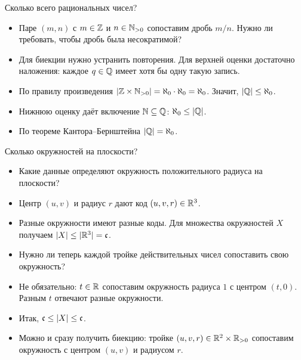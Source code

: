 \documentclass[10pt]{beamer}
\begin{document}
\begin{frame}{Сколько всего рациональных чисел?}
    \begin{itemize}
        \item Паре $(m,n)$ с $m\in\mathbb{Z}$ и $n\in\mathbb{N}_{>0}$ сопоставим дробь $m/n$. Нужно ли требовать, чтобы дробь была несократимой?
        \item<2-> Для биекции нужно устранить повторения. Для верхней оценки достаточно наложения: каждое $q\in\mathbb{Q}$ имеет хотя бы одну такую запись.
        \item<3-> По правилу произведения $|\mathbb{Z}\times\mathbb{N}_{>0}|=\aleph_0\cdot\aleph_0=\aleph_0$. Значит, $|\mathbb{Q}|\leq\aleph_0$.
        \item<4-> Нижнюю оценку даёт включение $\mathbb{N}\subseteq\mathbb{Q}$: $\aleph_0\leq|\mathbb{Q}|$.
        \item<5-> По теореме Кантора--Бернштейна $|\mathbb{Q}|=\aleph_0$.
    \end{itemize}
\end{frame}

\begin{frame}{Сколько окружностей на плоскости?}
    \begin{itemize}
        \item Какие данные определяют окружность положительного радиуса на плоскости?
        \item<2-> Центр $(u,v)$ и радиус $r$ дают код $(u,v,r)\in\mathbb{R}^3$.
        \item<3-> Разные окружности имеют разные коды. Для множества окружностей $X$ получаем $|X|\leq|\mathbb{R}^3|=\mathfrak{c}$.
        \item<4-> Нужно ли теперь каждой тройке действительных чисел сопоставить свою окружность?
        \item<5-> Не обязательно: $t\in\mathbb{R}$ сопоставим окружность радиуса $1$ с центром $(t,0)$. Разным $t$ отвечают разные окружности.
        \item<6-> Итак, $\mathfrak{c}\leq|X|\leq\mathfrak{c}$.
        \item<7-> Можно и сразу получить биекцию: тройке $(u,v,r)\in\mathbb{R}^2\times\mathbb{R}_{>0}$ сопоставим окружность с центром $(u,v)$ и радиусом $r$.
    \end{itemize}
\end{frame}
\end{document}
